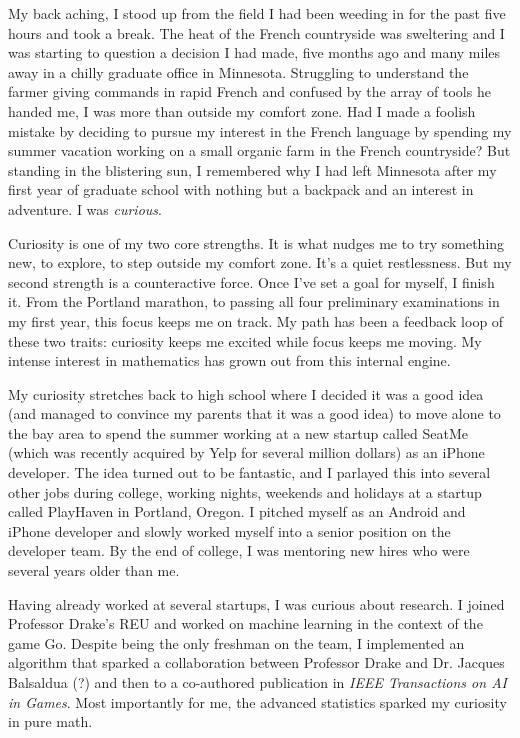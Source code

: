 \documentclass[12pt]{article}
\title{}
\begin{document}
My back aching, I stood up from the field I had been weeding in for the past five hours and took a break. The heat of the French countryside was sweltering and I was starting to question a  decision I had made, five months ago and many miles away in a chilly graduate office in Minnesota. Struggling to understand the farmer giving commands in rapid French and confused by the array of tools he handed me, I was more than outside my comfort zone. Had I made a foolish mistake by deciding to pursue my interest in the French language by spending my summer vacation working on a small organic farm in the French countryside? But standing in the blistering sun, I remembered why I had left Minnesota after my first year of graduate school with nothing but a backpack and an interest in adventure. I was \textit{curious}.  

Curiosity is one of my two core strengths. It is what nudges me to try something new, to explore, to step outside my comfort zone. It's a quiet restlessness. But my second strength is a counteractive force. Once I've set a goal for myself, I finish it. From the Portland marathon, to passing all four preliminary examinations in my first year, this focus keeps me on track. My path has been a feedback loop of these two traits: curiosity keeps me excited while focus keeps me moving. My intense interest in mathematics has grown out from this internal engine.

My curiosity stretches back to high school where I decided it was a good idea (and managed to convince my parents that it was a good idea) to move alone to the bay area to spend the summer working at a new startup called SeatMe (which was recently acquired by Yelp for several million dollars) as an iPhone developer. The idea turned out to be fantastic, and I parlayed this into several other jobs during college, working nights, weekends and holidays at a startup called PlayHaven in Portland, Oregon. I pitched myself as an Android and iPhone developer and slowly worked myself into a senior position on the developer team. By the end of college, I was mentoring new hires who were several years older than me.

Having already worked at several startups, I was curious about research. I joined Professor Drake's REU and worked on machine learning in the context of the game Go. Despite being the only freshman on the team, I implemented an algorithm that sparked a collaboration between Professor Drake and Dr. Jacques Balsaldua (?) and then to a co-authored publication in \textit{IEEE Transactions on AI in Games}. Most importantly for me, the advanced statistics sparked my curiosity in pure math. 
\end{document}
